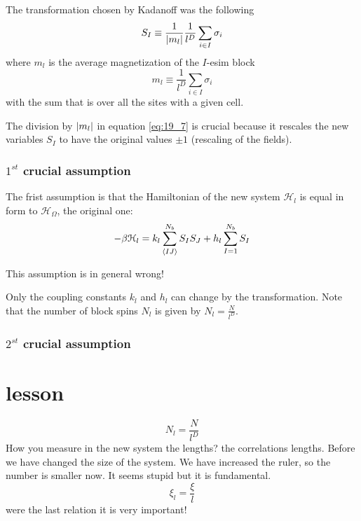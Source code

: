\documentclass[../main/main.tex]{subfiles}
\begin{document}
The transformation chosen by Kadanoff was the following
\begin{equation}
  S_I \equiv \frac{1}{\abs{m_l} } \frac{1}{l^D} \sum_{i \in I}^{}  \sigma _i
  \label{eq:19_7}
\end{equation}
where \( m_l \) is the average magnetization of the \( I \)-esim block
\begin{equation}
  m_l \equiv \frac{1}{l^D} \sum_{i \in I}^{} \sigma _i
\end{equation}
with the sum that is over all the sites with a given cell.
\begin{remark}
The division by \( \abs{m_l}  \) in equation \eqref{eq:19_7} is crucial because it rescales the new variables \( S_I \) to have the original values \( \pm 1 \) (rescaling of the fields).
\end{remark}

\subsubsection{\(  1^{st} \) crucial assumption}
The frist assumption is that the Hamiltonian of the new system \( \mathcal{H}_l \) is equal in form to \( \mathcal{H}_ \Omega  \), the original one:
\begin{equation}
  - \beta \mathcal{H}_l = k_l \sum_{\expval{IJ} }^{N_b} S_I S_J  + h_l \sum_{I=1}^{N_b} S_I
\end{equation}
\begin{remark}
This assumption is in general wrong!
\end{remark}
Only the coupling constants \( k_l \) and \( h_l \) can change by the transformation. Note that the number of block spins \( N_l \) is given by \(   N_l = \frac{N}{l^D} \).

\subsubsection{\(  2^{st} \) crucial assumption}


\section{lesson}







\begin{equation}
  N_l = \frac{N}{l^D}
\end{equation}
How you measure in the new system the lengths? the correlations lengths. Before we have changed the size of the system. We have increased the ruler, so the number is smaller now. It seems stupid but it is fundamental.
\begin{equation}
  \xi _l = \frac{\xi }{l}
\end{equation}
were the last relation it is very important!
\end{document}
